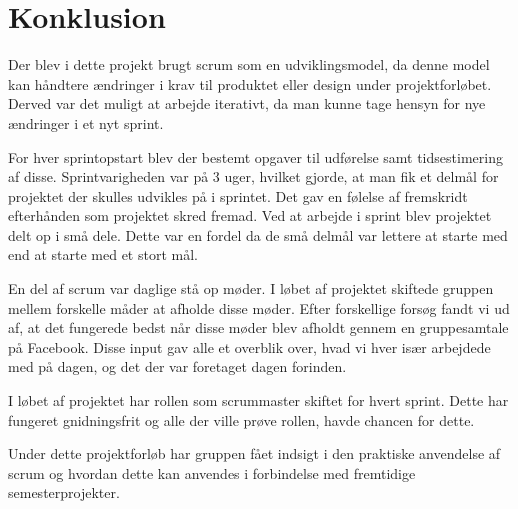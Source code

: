 \chapter{Konklusion}
Der blev i dette projekt brugt scrum som en udviklingsmodel, da denne model kan håndtere ændringer i krav til produktet eller design under projektforløbet. Derved var det muligt at arbejde iterativt, da man kunne tage hensyn for nye ændringer i et nyt sprint. \newline

 \noindent For hver sprintopstart blev der bestemt opgaver til udførelse samt tidsestimering af disse. Sprintvarigheden var på 3 uger, hvilket gjorde, at man fik et delmål for projektet der skulles udvikles på i sprintet. Det gav en følelse af fremskridt efterhånden som projektet skred fremad. Ved at arbejde i sprint blev projektet delt op i små dele. Dette var en fordel da de små delmål var lettere at starte med end at starte med et stort mål. \newline 
 
 \noindent En del af scrum var daglige stå op møder. I løbet af projektet skiftede gruppen mellem forskelle måder at afholde disse møder. Efter forskellige forsøg fandt vi ud af, at det fungerede bedst når disse møder blev afholdt gennem en gruppesamtale på Facebook. Disse input gav alle et overblik over, hvad vi hver især arbejdede med på dagen, og det der var foretaget dagen forinden. \newline
  
 \noindent I løbet af projektet har rollen som scrummaster skiftet for hvert sprint. Dette har fungeret gnidningsfrit og alle der ville prøve rollen, havde chancen for dette. \newline
 
 \noindent Under dette projektforløb har gruppen fået indsigt i den praktiske anvendelse af scrum og hvordan dette kan anvendes i forbindelse med fremtidige semesterprojekter. 

 



 



